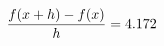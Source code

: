 \documentclass[preview]{standalone}
\begin{document}
\begin{align*}
\special{dvisvgm:raw <g id='unique000'>}\frac{f(x+h)-f(x)}{h} = 4.172\special{dvisvgm:raw </g>}
\end{align*}
\end{document}
